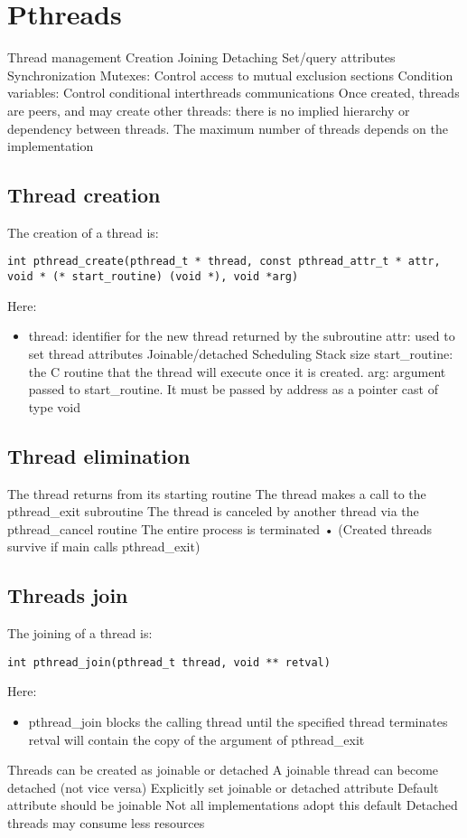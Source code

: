 \section{Pthreads}

Thread management
Creation
Joining
Detaching
Set/query attributes
Synchronization
Mutexes: Control access to mutual exclusion
sections
Condition variables: Control conditional interthreads communications
Once created, threads are peers, and may create
other threads: there is no implied hierarchy or
dependency between threads.
The maximum number of threads depends on the
implementation

\subsection{Thread creation}
The creation of a thread is: 
\begin{lstlisting}[style=C]
int pthread_create(pthread_t * thread, const pthread_attr_t * attr, void * (* start_routine) (void *), void *arg)
\end{lstlisting}
Here: 
\begin{itemize}
    \item thread: identifier for the new thread returned by
    the subroutine
    attr: used to set thread attributes
    Joinable/detached
    Scheduling
    Stack size
    start_routine: the C routine that the thread will
    execute once it is created.
    arg: argument passed to start_routine. It must be
    passed by address as a pointer cast of type void
\end{itemize}

\subsection{Thread elimination}
The thread returns from its starting routine
The thread makes a call to the pthread_exit
subroutine
The thread is canceled by another thread via the
pthread_cancel routine
The entire process is terminated
• (Created threads survive if main calls
pthread_exit)

\subsection{Threads join}
The joining of a thread is: 
\begin{lstlisting}[style=C]
int pthread_join(pthread_t thread, void ** retval)
\end{lstlisting}
Here: 
\begin{itemize}
    \item pthread_join blocks the calling thread until the
    specified thread terminates
    retval will contain the copy of the argument of
    pthread_exit
\end{itemize}
Threads can be created as joinable or detached
A joinable thread can become detached (not vice
versa)
Explicitly set joinable or detached attribute
Default attribute should be joinable
Not all implementations adopt this default
Detached threads may consume less resources

